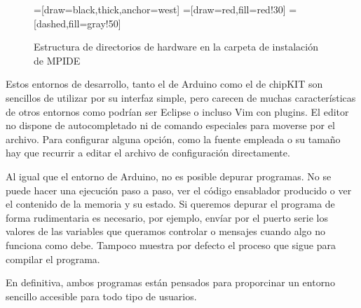 \begin{figure}
\begin{center}
=[draw=black,thick,anchor=west]
=[draw=red,fill=red!30]
=[dashed,fill=gray!50]
\end{center}
\caption{Estructura de directorios de hardware en la carpeta de instalación de MPIDE}
\label{mpide_carpetas}
\end{figure}

Estos entornos de desarrollo, tanto el de Arduino como el de chipKIT son sencillos de utilizar por su interfaz simple, pero carecen de muchas características de otros entornos como podrían ser Eclipse o incluso Vim con plugins. El editor no dispone de autocompletado ni de comando especiales para moverse por el archivo. Para configurar alguna opción, como la fuente empleada o su tamaño hay que recurrir a editar el archivo de configuración directamente.

Al igual que el entorno de Arduino, no es posible depurar programas.  No se puede hacer una ejecución paso a paso, ver el código ensablador producido o ver el contenido de la memoria y su estado.  Si queremos depurar el programa de forma rudimentaria es necesario, por ejemplo, envíar por el puerto serie los valores de las variables que queramos controlar o mensajes cuando algo no funciona como debe. Tampoco muestra por defecto el proceso que sigue para compilar el programa.

En definitiva, ambos programas están pensados para proporcinar un entorno sencillo accesible para todo tipo de usuarios.

